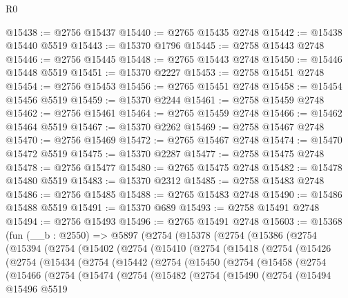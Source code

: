 \begin{lexlean}{R0}
\begin{coremodule}
@15438 := @2756 @15437
@15440 := @2765 @15435 @2748
@15442 := @15438 @15440 @5519
@15443 := @15370 @1796
@15445 := @2758 @15443 @2748
@15446 := @2756 @15445
@15448 := @2765 @15443 @2748
@15450 := @15446 @15448 @5519
@15451 := @15370 @2227
@15453 := @2758 @15451 @2748
@15454 := @2756 @15453
@15456 := @2765 @15451 @2748
@15458 := @15454 @15456 @5519
@15459 := @15370 @2244
@15461 := @2758 @15459 @2748
@15462 := @2756 @15461
@15464 := @2765 @15459 @2748
@15466 := @15462 @15464 @5519
@15467 := @15370 @2262
@15469 := @2758 @15467 @2748
@15470 := @2756 @15469
@15472 := @2765 @15467 @2748
@15474 := @15470 @15472 @5519
@15475 := @15370 @2287
@15477 := @2758 @15475 @2748
@15478 := @2756 @15477
@15480 := @2765 @15475 @2748
@15482 := @15478 @15480 @5519
@15483 := @15370 @2312
@15485 := @2758 @15483 @2748
@15486 := @2756 @15485
@15488 := @2765 @15483 @2748
@15490 := @15486 @15488 @5519
@15491 := @15370 @689
@15493 := @2758 @15491 @2748
@15494 := @2756 @15493
@15496 := @2765 @15491 @2748
@15603 := @15368
    (fun (__b : @2550) =>
    @5897
      (@2754
        (@15378
          (@2754
            (@15386
              (@2754
                (@15394
                  (@2754
                    (@15402
                      (@2754
                        (@15410
                          (@2754
                            (@15418
                              (@2754
                                (@15426
                                  (@2754
                                    (@15434
                                      (@2754
                                        (@15442
                                          (@2754
                                            (@15450
                                              (@2754
                                                (@15458
                                                  (@2754
                                                    (@15466
                                                      (@2754
                                                        (@15474
                                                          (@2754
                                                            (@15482
                                                              (@2754
                                                                (@15490
                                                                  (@2754
                                                                    (@15494
                                                                      @15496
                                                                      @5519

\end{coremodule}
\end{lexlean}
